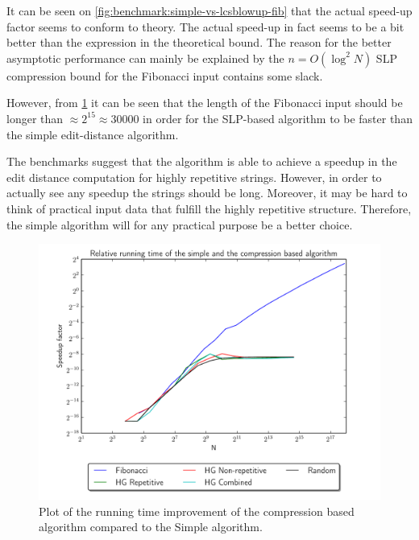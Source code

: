 \documentclass[twoside,11pt,openright]{report}
\begin{document}
It can be seen on \cref{fig:benchmark:simple-vs-lcsblowup-fib} that the actual speed-up factor seems to conform to theory. The actual speed-up in fact seems to be a bit better than the expression in the theoretical bound. The reason for the better asymptotic performance can mainly be explained by the $n = O(\log^2{N})$ SLP compression bound for the Fibonacci input contains some slack.

However, from \cref{fig:benchmark:simple-vs-lcsblowup} it can be seen that the length of the Fibonacci input should be longer than $\approx 2^{15} \approx 30000$ in order for the SLP-based algorithm to be faster than the simple edit-distance algorithm.

The benchmarks suggest that the algorithm is able to achieve a speedup in the edit distance computation for highly repetitive strings. However, in order to actually see any speedup the strings should be long. Moreover, it may be hard to think of practical input data that fulfill the highly repetitive structure. Therefore, the simple algorithm will for any practical purpose be a better choice.

\begin{figure}[!htb]
  \centering
  \includegraphics[width=13cm]{combined/simple_vs_lcs}
  \caption{Plot of the running time improvement of the compression based algorithm compared to the Simple algorithm.}
  \label{fig:benchmark:simple-vs-lcsblowup}
\end{figure}
\end{document}

